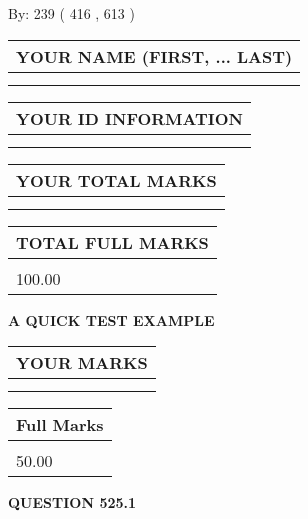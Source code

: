 \documentclass[12pt]{article}
\begin{document}
   
\hspace{1.0in} By: 
 239 ( 416 ,  613 )
   
   
   
   
\newpage 
\setcounter{page}{ 
   525001 } 
   
   
   
   
\noindent\begin{tabular}{|l|}
\hline
YOUR NAME (FIRST, ... LAST)  \\
\hline
 \\ 
 \\ 
\hline
\end{tabular}
\hspace{0.05in} \begin{tabular}{|l|}
\hline
 YOUR   ID   INFORMATION  \\
\hline
 \\ 
 \\ 
\hline
\end{tabular}
   
   
\vspace{0.2in}\noindent\begin{tabular}{|l|}
\hline
YOUR TOTAL MARKS  \\
\hline
 \\ 
 \\ 
\hline
\end{tabular}
\hspace{0.05in} \begin{tabular}{|l|}
\hline
TOTAL FULL MARKS  \\
\hline
 \\ 
100.00 \\
\hline
\end{tabular}
   
   
 \vspace{0.2in}
{\LARGE {\textbf{ A QUICK TEST EXAMPLE}}}
   
   
  
\vspace{0.2in}
  
\noindent\begin{tabular}{|l|}
\hline
 YOUR MARKS  \\
\hline
 \\ 
 \\ 
\hline
\end{tabular}
\hspace{0.05in} \begin{tabular}{|l|}
\hline
 Full Marks  \\
\hline
 \\ 
50.00 \\
\hline
\end{tabular}
{\textbf{\Large{QUESTION
525.1 
}}}
  
\end{document}
